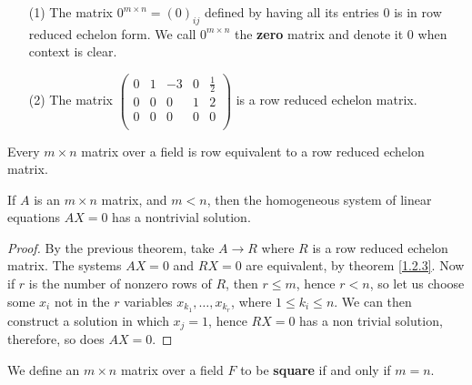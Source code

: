 \begin{example}
    \begin{enumerate}
        \item[(1)] The matrix $0^{m \times n}=(0)_{ij}$ defined by having all its entries $0$ is in
            row reduced echelon form. We call  $0^{m \times n}$ the \textbf{zero} matrix and denote
            it $0$ when context is clear.

        \item[(2)] The matrix $\begin{pmatrix}
                                0 & 1 & -3 & 0 & \frac{1}{2} \\
                                0 & 0 &  0 & 1 & 2 \\
                                0 & 0 &  0 & 0 & 0 \\
                           \end{pmatrix}$
            is a row reduced echelon matrix.
    \end{enumerate}
\end{example} 

\begin{theorem}\label{1.3.2}
    Every $m \times n$ matrix over a field is row equivalent to a row reduced echelon matrix.
\end{theorem}

\begin{theorem}\label{1.3.3}
    If $A$ is an  $m \times n$ matrix, and  $m < n$, then the homogeneous system of linear equations
     $AX=0$ has a nontrivial solution.
\end{theorem}
\begin{proof}
    By the previous theorem, take $A \rightarrow R$ where $R$ is a row reduced echelon matrix. The
    systems  $AX=0$ and  $RX=0$ are equivalent, by theorem \ref {1.2.3}. Now if $r$ is the number of
    nonzero rows of  $R$, then  $r \leq m$, hence  $r<n$, so let us choose some  $x_i$ not in the
    $r$ variables  $x_{k_1}, \dots, x_{k_r}$, where $1 \leq k_i \leq n$. We can then construct a
    solution in which $x_j=1$, hence  $RX=0$ has a non trivial solution, therefore, so does  $AX=0$.
\end{proof}

\begin{definition}
    We define an $m \times n$ matrix over a field  $F$ to be  \textbf{square} if and only if $m=n$.
\end{definition}

